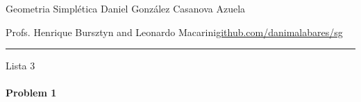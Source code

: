 

%



\begin{minipage}{\textwidth}
	\begin{minipage}{1\textwidth}
		Geometria Simpl\'etica \hfill Daniel González Casanova Azuela
		
		{\small Profs. Henrique Bursztyn and Leonardo Macarini\hfill\href{https://github.com/danimalabares/sg}{github.com/danimalabares/sg}}
	\end{minipage}
\end{minipage}\vspace{.2cm}\hrule

\vspace{10pt}
{\huge Lista 3}

\tableofcontents

\paragraph{Problem 1}

